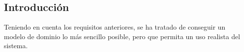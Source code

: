 \subsection{Introducción}

Teniendo en cuenta los requisitos anteriores, se ha tratado de conseguir un modelo de dominio lo más sencillo posible, pero que permita un uso realista del sistema.

